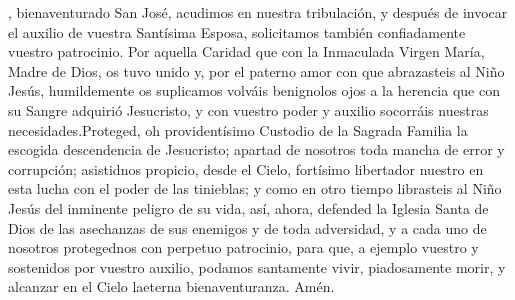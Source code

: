 , bienaventurado San José, acudimos en nuestra tribulación, y después de invocar el auxilio de vuestra Santísima Esposa, solicitamos
también confiadamente vuestro patrocinio. Por aquella Caridad que con la Inmaculada Virgen María, Madre de Dios, os tuvo unido y, por el paterno amor 
con que abrazasteis al Niño Jesús, humildemente os suplicamos volváis benignolos ojos a la herencia que con su Sangre adquirió Jesucristo, y con vuestro 
poder y auxilio socorráis nuestras necesidades.Proteged, oh providentísimo Custodio de la Sagrada Familia la escogida descendencia de Jesucristo; 
apartad de nosotros toda mancha de error y corrupción; asistidnos propicio, desde el Cielo, fortísimo libertador nuestro en esta lucha con el poder de
las tinieblas; y como en otro tiempo librasteis al Niño Jesús del inminente peligro de su vida, así, ahora, defended la Iglesia Santa de Dios de las 
asechanzas de sus enemigos y de toda adversidad, y a cada uno de nosotros protegednos con perpetuo patrocinio, para que, a ejemplo vuestro y sostenidos 
por vuestro auxilio, podamos santamente vivir, piadosamente morir, y alcanzar en el Cielo laeterna bienaventuranza. Amén.